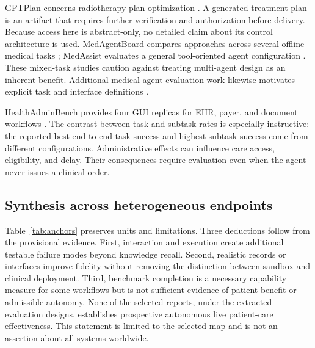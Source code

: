 GPTPlan concerns radiotherapy plan optimization \cite{gptplan2025}. A generated treatment plan is an artifact that requires further verification and authorization before delivery. Because access here is abstract-only, no detailed claim about its control architecture is used. MedAgentBoard compares approaches across several offline medical tasks \cite{medagentboard2025}; MedAssist evaluates a general tool-oriented agent configuration \cite{medassist2026}. These mixed-task studies caution against treating multi-agent design as an inherent benefit. Additional medical-agent evaluation work likewise motivates explicit task and interface definitions \cite{medicalagentsbench2026}.

HealthAdminBench provides four GUI replicas for EHR, payer, and document workflows \cite{healthadmin2026}. The contrast between task and subtask rates is especially instructive: the reported best end-to-end task success and highest subtask success come from different configurations. Administrative effects can influence care access, eligibility, and delay. Their consequences require evaluation even when the agent never issues a clinical order.

\subsection{Synthesis across heterogeneous endpoints}
Table~\ref{tab:anchors} preserves units and limitations. Three deductions follow from the provisional evidence. First, interaction and execution create additional testable failure modes beyond knowledge recall. Second, realistic records or interfaces improve fidelity without removing the distinction between sandbox and clinical deployment. Third, benchmark completion is a necessary capability measure for some workflows but is not sufficient evidence of patient benefit or admissible autonomy. None of the selected reports, under the extracted evaluation designs, establishes prospective autonomous live patient-care effectiveness. This statement is limited to the selected map and is not an assertion about all systems worldwide.
